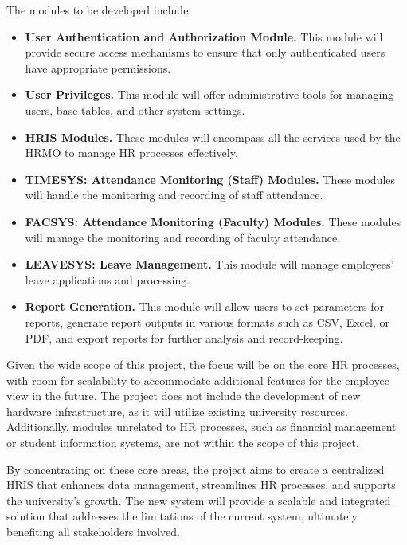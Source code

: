     The modules to be developed include:
    
    \begin{itemize}
        \item[] \textbf{User Authentication and Authorization Module.} This module will provide secure access mechanisms to ensure that only authenticated users have appropriate permissions.
        \item[] \textbf{User Privileges.} This module will offer administrative tools for managing users, base tables, and other system settings.
        \item[] \textbf{HRIS Modules.} These modules will encompass all the services used by the HRMO to manage HR processes effectively.
        \item[] \textbf{TIMESYS: Attendance Monitoring (Staff) Modules.} These modules will handle the monitoring and recording of staff attendance.
        \item[] \textbf{FACSYS: Attendance Monitoring (Faculty) Modules.} These modules will manage the monitoring and recording of faculty attendance.
        \item[] \textbf{LEAVESYS: Leave Management.} This module will manage employees' leave applications and processing.
        \item[] \textbf{Report Generation.} This module will allow users to set parameters for reports, generate report outputs in various formats such as CSV, Excel, or PDF, and export reports for further analysis and record-keeping.
    \end{itemize}
    
    Given the wide scope of this project, the focus will be on the core HR processes, with room for scalability to accommodate additional features for the employee view in the future. The project does not include the development of new hardware infrastructure, as it will utilize existing university resources. Additionally, modules unrelated to HR processes, such as financial management or student information systems, are not within the scope of this project.
    
    By concentrating on these core areas, the project aims to create a centralized HRIS that enhances data management, streamlines HR processes, and supports the university's growth. The new system will provide a scalable and integrated solution that addresses the limitations of the current system, ultimately benefiting all stakeholders involved.


